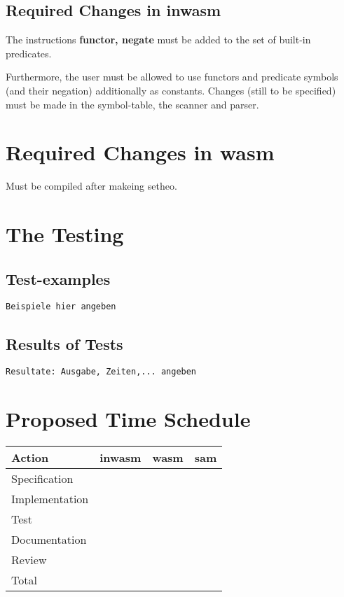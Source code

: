 \subsection{Required Changes in inwasm}

The instructions {\bf functor, negate} must be added to the set of
built-in predicates.

Furthermore, the user must be allowed to use functors and predicate
symbols (and their negation) additionally as constants. Changes (still
to be specified) must be made in the symbol-table, the scanner and
parser.

\section{Required Changes in wasm}

Must be compiled after makeing setheo.

\section{The Testing}
\subsection{Test-examples}
{\tt Beispiele hier angeben}

\subsection{Results of Tests}
{\tt Resultate: Ausgabe, Zeiten,... angeben}

\section{Proposed Time Schedule}

\begin{center}
\begin{tabular}{|l|r|r|r|}
\hline\hline
Action & inwasm & wasm & sam \\
\hline
Specification & & & \\
Implementation & & & \\
Test & & & \\
Documentation & & & \\
Review & & & \\
\hline
Total & & & \\
\hline\hline
\end{tabular}
\end{center}


